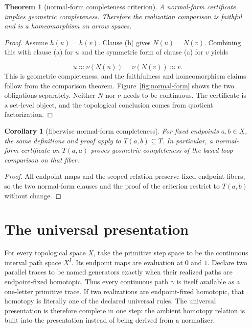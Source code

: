 \documentclass[10pt,reqno]{amsart}
\theoremstyle{definition}
\theoremstyle{plain}
\newtheorem{theorem}[definition]{Theorem}
\newtheorem{corollary}[definition]{Corollary}
\theoremstyle{remark}
\begin{document}
\begin{theorem}[normal-form completeness criterion]\label{thm:normal-form-completeness}
A normal-form certificate implies geometric completeness.  Therefore
the realization comparison is faithful and is a homeomorphism on arrow spaces.
\end{theorem}

\begin{proof}
Assume $h(u)=h(v)$.  Clause (b) gives
$N(u)=N(v)$.  Combining this with clause (a) for $u$ and the symmetric form
of clause (a) for $v$ yields

\[
  u\approx\nu(N(u))=\nu(N(v))\approx v.
\]
This is geometric completeness, and the faithfulness and homeomorphism
claims follow from the comparison theorem.  Figure~\ref{fig:normal-form}
shows the two obligations separately.  Neither $N$ nor $\nu$ needs to be
continuous.  The certificate is a set-level object, and the topological
conclusion comes from quotient factorization.
\end{proof}



\begin{corollary}[fiberwise normal-form completeness]\label{cor:fiberwise-normal-form}
For fixed endpoints $a,b\in X$, the same definitions and proof apply to
$T(a,b)\subseteq T$.
In particular, a normal-form certificate on $T(a,a)$ proves geometric
completeness of the based-loop comparison on that fiber.
\end{corollary}

\begin{proof}
All endpoint maps and the scoped relation preserve fixed endpoint fibers, so
the two normal-form clauses and the proof of the criterion restrict to
$T(a,b)$ without change.
\end{proof}

\section{The universal presentation}
\label{sec:universal}

For every topological space $X$, take the primitive step space to be the
continuous interval path space $X^I$.  Its endpoint maps are evaluation at
$0$ and $1$.  Declare two parallel traces to be named generators exactly when
their realized paths are endpoint-fixed homotopic.
Thus every continuous path $\gamma$ is itself available as a one-letter
primitive trace.  If two realizations are endpoint-fixed homotopic, that
homotopy is literally one of the declared universal rules.  The universal
presentation is therefore complete in one step: the ambient homotopy relation
is built into the presentation instead of being derived from a normalizer.
\end{document}
